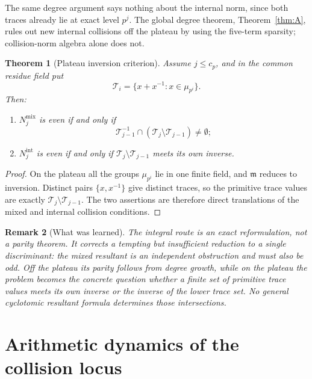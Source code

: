 \documentclass[a4paper]{article}
\newtheorem{theorem}{Theorem}[section]
\newtheorem{remark}[theorem]{Remark}
\begin{document}
The same degree argument says nothing about the internal norm, since both
traces already lie at exact level $p^j$.  The global degree theorem,
Theorem~\ref{thm:A}, rules out new internal collisions off the plateau by
using the five-term sparsity; collision-norm algebra alone does not.

\begin{theorem}[Plateau inversion criterion]\label{thm:plateau-inversion}
	Assume $j\leq c_p$, and in the common residue field put
	\[
		\mathcal T_i
		=\{x+x^{-1}:x\in\mu_{p^i}\}.
	\]
	Then:
	\begin{enumerate}
		\item $N_j^{\mathrm{mix}}$ is even if and only if
		      \[
			      \mathcal T_{j-1}^{-1}
			      \cap(\mathcal T_j\setminus\mathcal T_{j-1})
			      \neq\emptyset;
		      \]
		\item $N_j^{\mathrm{int}}$ is even if and only if
		      $\mathcal T_j\setminus\mathcal T_{j-1}$ meets its own
		      inverse.
	\end{enumerate}
\end{theorem}

\begin{proof}
	On the plateau all the groups $\mu_{p^i}$ lie in one finite field, and
	$\mathfrak m$ reduces to inversion.  Distinct pairs
	$\{x,x^{-1}\}$ give distinct traces, so the primitive trace values are
	exactly $\mathcal T_j\setminus\mathcal T_{j-1}$.  The two assertions
	are therefore direct translations of the mixed and internal collision
	conditions.
\end{proof}

\begin{remark}[What was learned]
	The integral route is an exact reformulation, not a parity theorem.
	It corrects a tempting but insufficient reduction to a single
	discriminant: the mixed resultant is an independent obstruction and
	must also be odd.  Off the plateau its parity follows from degree
	growth, while on the plateau the problem becomes the concrete question
	whether a finite set of primitive trace values meets its own inverse or
	the inverse of the lower trace set.  No general cyclotomic resultant
	formula determines those intersections.
\end{remark}

\section{Arithmetic dynamics of the collision locus}\label{sec:dynamics}
\end{document}

